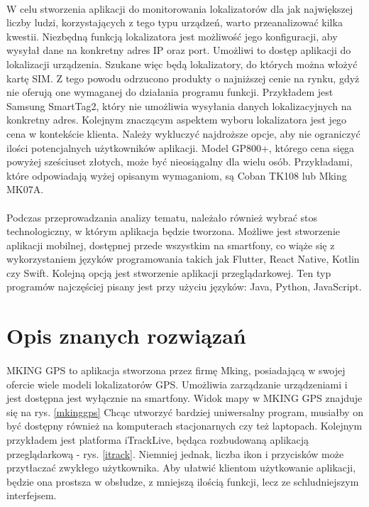 \paragraph{}
W celu stworzenia aplikacji do monitorowania lokalizatorów dla jak największej liczby ludzi, korzystających z tego typu urządzeń, warto przeanalizować kilka kwestii. Niezbędną funkcją lokalizatora jest możliwość jego konfiguracji, aby wysyłał dane na konkretny adres IP oraz port. Umożliwi to dostęp aplikacji do lokalizacji urządzenia. Szukane więc będą lokalizatory, do których można włożyć kartę SIM. Z tego powodu odrzucono produkty o najniższej cenie na rynku, gdyż nie oferują one wymaganej do działania programu funkcji. Przykładem jest Samsung SmartTag2, który nie umożliwia wysyłania danych lokalizacyjnych na konkretny adres. Kolejnym znaczącym aspektem wyboru lokalizatora jest jego cena w kontekście klienta. Należy wykluczyć najdroższe opcje, aby nie ograniczyć ilości potencjalnych użytkowników aplikacji. Model GP800+, którego cena sięga powyżej sześciuset złotych, może być nieosiągalny dla wielu osób. Przykładami, które odpowiadają wyżej opisanym wymaganiom, są Coban TK108 lub Mking MK07A.

\paragraph{}
Podczas przeprowadzania analizy tematu, należało również wybrać stos technologiczny, w którym aplikacja będzie tworzona. Możliwe jest stworzenie aplikacji mobilnej, dostępnej przede wszystkim na smartfony, co wiąże się z wykorzystaniem języków programowania takich jak Flutter, React Native, Kotlin czy Swift. Kolejną opcją jest stworzenie aplikacji przeglądarkowej. Ten typ programów najczęściej pisany jest przy użyciu języków: Java, Python, JavaScript.

\section{Opis znanych rozwiązań}

\paragraph{}
MKING GPS to aplikacja stworzona przez firmę Mking, posiadającą w swojej ofercie wiele modeli lokalizatorów GPS. Umożliwia zarządzanie urządzeniami i jest dostępna jest wyłącznie na smartfony. Widok mapy w MKING GPS znajduje się na rys. \ref{mkinggps}  Chcąc utworzyć bardziej uniwersalny program, musiałby on być dostępny również na komputerach stacjonarnych czy też laptopach. Kolejnym przykładem jest platforma iTrackLive, będąca rozbudowaną aplikacją przeglądarkową - rys. \ref{itrack}. Niemniej jednak, liczba ikon i przycisków może przytłaczać zwykłego użytkownika. Aby ułatwić klientom użytkowanie aplikacji, będzie ona prostsza w obsłudze, z mniejszą ilością funkcji, lecz ze schludniejszym interfejsem.


